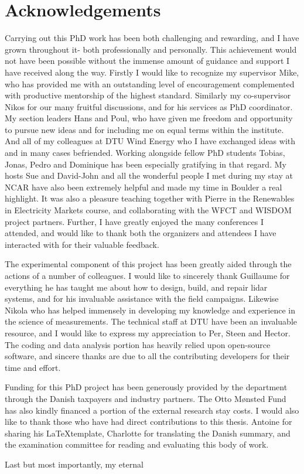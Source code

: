 \chapter{Acknowledgements}
\label{sec:acknowledgements}

Carrying out this PhD work has been both challenging and rewarding, and I have grown throughout it- both professionally and personally. This achievement would not have been possible without the immense amount of guidance and support I have received along the way. Firstly I would like to recognize my supervisor Mike, who has provided me with an outstanding level of encouragement complemented with productive mentorship of the highest standard. Similarly my co-supervisor Nikos for our many fruitful discussions, and for his services as PhD coordinator. My section leaders Hans and Poul, who have given me freedom and opportunity to pursue new ideas and for including me on equal terms within the institute. And all of my colleagues at DTU Wind Energy who I have exchanged ideas with and in many cases befriended. Working alongside fellow PhD students Tobias, Jonas, Pedro and Dominique has been especially gratifying in that regard. My hosts Sue and David-John and all the wonderful people I met during my stay at NCAR have also been extremely helpful and made my time in Boulder a real highlight. It was also a pleasure teaching together with Pierre in the Renewables in Electricity Markets course, and collaborating with the WFCT and WISDOM project partners. Further, I have greatly enjoyed the many conferences I attended, and would like to thank both the organizers and attendees I have interacted with for their valuable feedback.

The experimental component of this project has been greatly aided through the actions of a number of colleagues. I would like to sincerely thank Guillaume for everything he has taught me about how to design, build, and repair lidar systems, and for his invaluable assistance with the field campaigns. Likewise Nikola who has helped immensely in developing my knowledge and experience in the science of measurements. The technical staff at DTU have been an invaluable resource, and I would like to express my appreciation to Per, Steen and Hector. The coding and data analysis portion has heavily relied upon open-source software, and sincere thanks are due to all the contributing developers for their time and effort.

Funding for this PhD project has been generously provided by the department through the Danish taxpayers and industry partners. The Otto M{\o}nsted Fund has also kindly financed a portion of the external research stay costs. I would also like to thank those who have had direct contributions to this thesis. Antoine for sharing his \LaTeX template, Charlotte for translating the Danish summary, and the examination committee for reading and evaluating this body of work.

Last but most importantly, my eternal 

\begin{comment}
Mom & Dad, Rachael
Grandparents
\end{comment}
